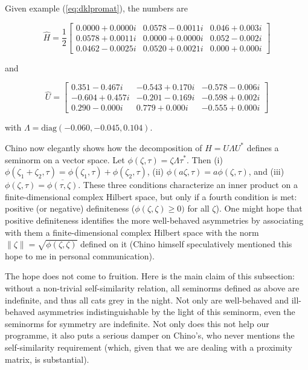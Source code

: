 \documentclass[11pt]{article}
\begin{document}
Given example (\ref{eq:dklpromat}), the numbers are
 
\begin{equation}
  \label{eq:dklh}
\hat{H}=\frac{1}{2}\left[
      \begin{array}{ccc}
   0.0000 + 0.0000i &  0.0578 - 0.0011i &  0.046 + 0.003i \\
   0.0578 + 0.0011i &  0.0000 + 0.0000i &  0.052 - 0.002i \\
   0.0462 - 0.0025i &  0.0520 + 0.0021i &  0.000 + 0.000i
      \end{array}
\right]
\end{equation}

and

\begin{equation}
  \label{eq:dklu}
\hat{U}=\left[
      \begin{array}{ccc}
   0.351 - 0.467i & -0.543 + 0.170i & -0.578 - 0.006i \\
  -0.604 + 0.457i & -0.201 - 0.169i & -0.598 + 0.002i \\
   0.290 - 0.000i &  0.779 + 0.000i & -0.555 + 0.000i
      \end{array}
\right]
\end{equation}

with $\Lambda=\mbox{diag}(-0.060,-0.045,0.104)$. 

Chino now elegantly shows how the decomposition of $H=U\Lambda{}U^{*}$
defines a seminorm on a vector space. Let
$\phi(\zeta,\tau)=\zeta\Lambda\tau^{*}$. Then (i)
$\phi(\zeta_{1}+\zeta_{2},\tau)=\phi(\zeta_{1},\tau)+\phi(\zeta_{2},\tau)$,
(ii) $\phi(a\zeta,\tau)=a\phi(\zeta,\tau)$, and (iii)
$\phi(\zeta,\tau)=\overline{\phi(\tau,\zeta)}$. These three conditions
characterize an inner product on a finite-dimensional complex Hilbert
space, but only if a fourth condition is met: positive (or negative)
definiteness ($\phi(\zeta,\zeta)\geq{}0)$ for all $\zeta$). One might
hope that positive definiteness identifies the more well-behaved
asymmetries by associating with them a finite-dimensional complex
Hilbert space with the norm $\|\zeta\|=\sqrt{\phi(\zeta,\zeta)}$
defined on it (Chino himself speculatively mentioned this hope to me
in personal communication).

The hope does not come to fruition. Here is the main claim of this
subsection: without a non-trivial self-similarity relation, all
seminorms defined as above are indefinite, and thus all cats grey in
the night. Not only are well-behaved and ill-behaved asymmetries
indistinguishable by the light of this seminorm, even the seminorms
for symmetry are indefinite. Not only does this not help our
programme, it also puts a serious damper on Chino's, who never
mentions the self-similarity requirement (which, given that we are
dealing with a proximity matrix, is substantial).
\end{document}
